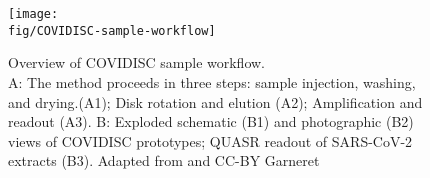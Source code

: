 \begin{figure}[h]
    \centering
        \texttt{[image: \\fig/COVIDISC-sample-workflow]}
        \caption{Overview of COVIDISC sample workflow.\\A: The method proceeds in three steps: sample injection, washing, and drying.(A1); Disk rotation and elution (A2); Amplification and readout (A3). B: Exploded schematic (B1) and photographic (B2) views of COVIDISC prototypes; QUASR readout of SARS-CoV-2 extracts (B3). Adapted from and CC-BY Garneret \etal\cite{Garneret2021}}
    \label{fig:covidisc}
\end{figure}